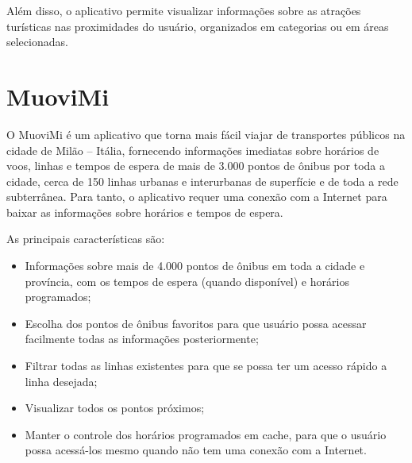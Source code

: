 Além disso, o aplicativo permite visualizar informações sobre as atrações turísticas nas proximidades do usuário, organizados em categorias ou em áreas selecionadas.

\section{MuoviMi}

O MuoviMi é um aplicativo que torna mais fácil viajar de transportes públicos na cidade de Milão – Itália, fornecendo informações imediatas sobre horários de voos, linhas e tempos de espera de mais de 3.000 pontos de ônibus por toda a cidade, cerca de 150 linhas urbanas e interurbanas de superfície e de toda a rede subterrânea. Para tanto, o aplicativo requer uma conexão com a Internet para baixar as informações sobre horários e tempos de espera. 

As principais características são:

\begin{itemize}
\item Informações sobre mais de 4.000 pontos de ônibus em toda a cidade e província, com os tempos de espera (quando disponível) e horários programados;
\item Escolha dos pontos de ônibus favoritos para que usuário possa acessar facilmente todas as informações posteriormente;
\item Filtrar todas as linhas existentes para que se possa ter um acesso rápido a linha desejada;
\item Visualizar todos os pontos próximos;
\item Manter o controle dos horários programados em cache, para que o usuário possa acessá-los mesmo quando não tem uma conexão com a Internet.
\end{itemize}

